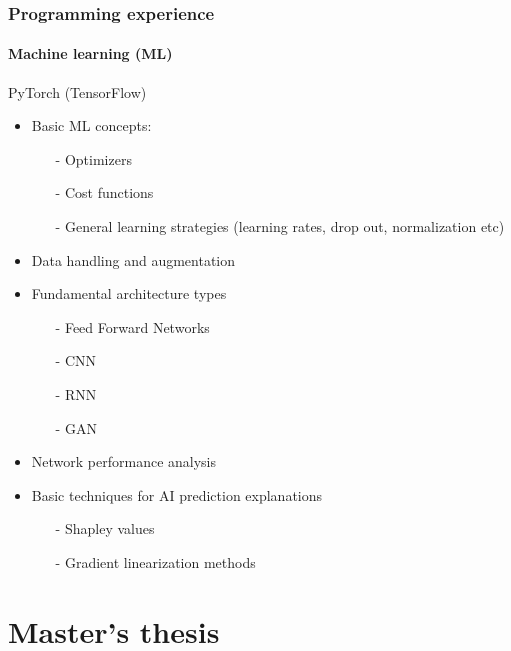 \documentclass[
	10pt, %
]{beamer}
\begin{document}
\begin{frame}
	\frametitle{Programming experience}
	\framesubtitle{Machine learning (ML)}

	{\large PyTorch} (TensorFlow) 
	\begin{itemize}
		\item Basic ML concepts: 
		\begin{itemize}
			\item [-] Optimizers
			\item [-] Cost functions
			\item [-] General learning strategies (learning rates, drop out, normalization etc)
		\end{itemize}
		
		\item Data handling and augmentation
		\item Fundamental architecture types 
		\begin{itemize}
			\item [-] Feed Forward Networks
			\item [-] CNN
			\item [-] RNN
			\item [-] GAN
		\end{itemize}
		\item Network performance analysis
		\item Basic techniques for AI prediction explanations
		\begin{itemize}
			\item [-] Shapley values
			\item [-] Gradient linearization methods
		\end{itemize}
	
	\end{itemize}


\end{frame}





\section{Master's thesis}
\end{document}

